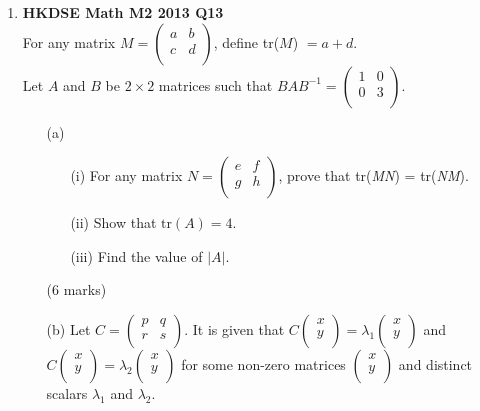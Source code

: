 \documentclass{report}
\begin{document}
\begin{enumerate}
	\item \textbf{HKDSE Math M2 2013 Q13}\\
	For any matrix $M = \begin{pmatrix}
		a&b\\c&d\\
	\end{pmatrix}$, define tr($M$) $= a + d$.\\
	Let $A$ and $B$ be $2 \times 2$ matrices such that $BAB^{-1} = \begin{pmatrix}
		1&0\\0&3\\
	\end{pmatrix}$. 
	\begin{enumerate}
		\item [(a)]
		\begin{enumerate}
			\item [(i)]For any matrix $N = \begin{pmatrix}
				e&f\\g&h\\
			\end{pmatrix}$, prove that tr(\textit{MN}) = tr(\textit{NM}).
			\item [(ii)]Show that $\text{tr}(A) = 4$. 
			\item [(iii)]Find the value of $|A|$.
		\end{enumerate}
		(6 marks)
		\item [(b)]Let $C = \begin{pmatrix}
			p&q\\r&s\\
		\end{pmatrix}$. It is given that $C \begin{pmatrix} x\\y\\ \end{pmatrix} = \lambda_1\begin{pmatrix} x\\y\\ \end{pmatrix}$ and $C \begin{pmatrix} x\\y\\ \end{pmatrix} = \lambda_2\begin{pmatrix} x\\y\\ \end{pmatrix}$ for some non-zero matrices $\begin{pmatrix} x\\y\\ \end{pmatrix}$ and distinct scalars $\lambda_1$ and $\lambda_2$. 

\end{enumerate}
\end{enumerate}
\end{document}
